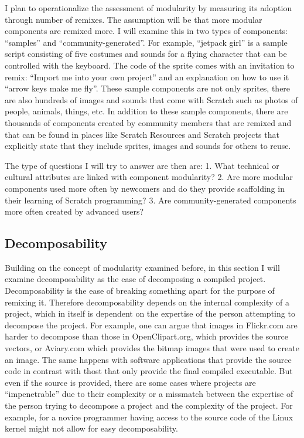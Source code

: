I plan to operationalize the assessment of modularity by measuring its adoption through number of remixes.
The assumption will be that more modular components are remixed more.
I will examine this in two types of components:  ``samples'' and ``community-generated''.
For example, ``jetpack girl'' is a sample script consisting of five costumes and  sounds for a flying character that can be controlled with the keyboard.
The code of the sprite comes with an invitation to remix: ``Import me into your own project'' and an explanation on how to use it ``arrow keys make me fly''.
These sample components are not only sprites, there are also hundreds of images and sounds that come with Scratch such as photos of people, animals, things, etc.
In addition to these sample components, there are thousands of components created by community members that are remixed and that can be found in places like Scratch Resources and Scratch projects that explicitly state that they include sprites, images and sounds for others to reuse.

The type of questions I will try to answer are then are:
1. What technical or cultural attributes are linked with component modularity? 
2. Are more modular components used more often by newcomers and do they provide scaffolding in their learning of Scratch programming?
3. Are community-generated components more often created by advanced users?

\subsection{Decomposability}
Building on the concept of modularity examined before, in this section I will examine decomposability as the ease of decomposing a compiled project.
Decomposability is the ease of breaking something apart for the purpose of remixing it.
Therefore decomposability depends on the internal complexity of a project, which in itself is dependent on the expertise of the person attempting to decompose the project.
For example, one can argue that images in Flickr.com are harder to decompose than those in OpenClipart.org, which provides the source vectors, or Aviary.com which provides the bitmap images that were used to create an image.
The same happens with software applications that provide the source code in contrast with thost that only provide the final compiled executable.
But even if the source is provided, there are some cases where projects are ``impenetrable'' due to their complexity or a missmatch between the expertise of the person trying to decompose a project and the complexity of the project. 
For example, for a novice programmer having access to the source code of the Linux kernel might not allow for easy decomposability.

